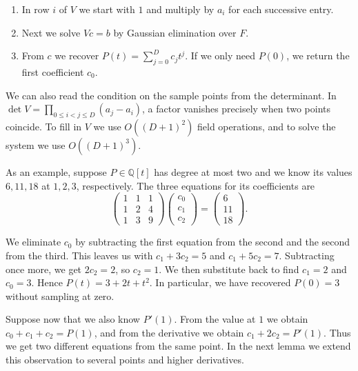 \documentclass{article}
\theoremstyle{definition}
\begin{document}
\begin{enumerate}
    \item In row \(i\) of \(V\) we start with \(1\) and multiply by
    \(a_i\) for each successive entry.
    \item Next we solve \(Vc=b\) by Gaussian elimination over \(F\).
    \item From \(c\) we recover \(P(t)=\sum_{j=0}^D c_jt^j\). If we
    only need \(P(0)\), we return the first coefficient \(c_0\).
\end{enumerate}

We can also read the condition on the sample points from the
determinant. In \(\det V=\prod_{0\le i<j\le D}(a_j-a_i)\), a factor
vanishes precisely when two points coincide. To fill in \(V\) we
use \(O((D+1)^2)\) field operations, and to solve the system we use
\(O((D+1)^3)\).

As an example, suppose \(P\in\mathbb Q[t]\) has degree at most two
and we know its values \(6,11,18\) at \(1,2,3\), respectively. The
three equations for its coefficients are
\[
    \begin{pmatrix}1&1&1\\1&2&4\\1&3&9\end{pmatrix}
    \begin{pmatrix}c_0\\c_1\\c_2\end{pmatrix}
    =\begin{pmatrix}6\\11\\18\end{pmatrix}.
\]

We eliminate \(c_0\) by subtracting the first equation from the second
and the second from the third. This leaves us with \(c_1+3c_2=5\) and
\(c_1+5c_2=7\). Subtracting once more, we get \(2c_2=2\), so \(c_2=1\).
We then substitute back to find \(c_1=2\) and \(c_0=3\).
Hence \(P(t)=3+2t+t^2\). In particular, we have recovered \(P(0)=3\)
without sampling at zero.

Suppose now that we also know \(P'(1)\). From the value at \(1\) we
obtain \(c_0+c_1+c_2=P(1)\), and from the derivative we obtain
\(c_1+2c_2=P'(1)\). Thus we get two different equations from
the same point. In the next lemma we extend this observation to
several points and higher derivatives.
\end{document}
